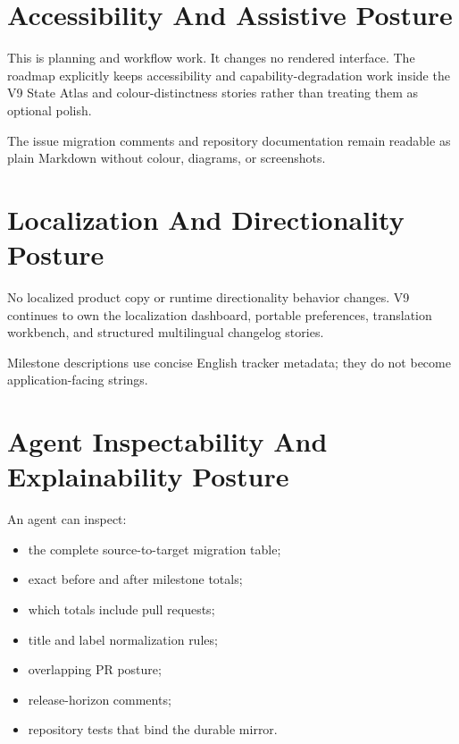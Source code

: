 \section{Accessibility And Assistive Posture}\label{record-249-accessibility-and-assistive-posture}

This is planning and workflow work. It changes no rendered interface. The roadmap explicitly keeps accessibility and capability-degradation work inside the V9 State Atlas and colour-distinctness stories rather than treating them as optional polish.

The issue migration comments and repository documentation remain readable as plain Markdown without colour, diagrams, or screenshots.

\section{Localization And Directionality Posture}\label{record-249-localization-and-directionality-posture}

No localized product copy or runtime directionality behavior changes. V9 continues to own the localization dashboard, portable preferences, translation workbench, and structured multilingual changelog stories.

Milestone descriptions use concise English tracker metadata; they do not become application-facing strings.

\section{Agent Inspectability And Explainability Posture}\label{record-249-agent-inspectability-and-explainability-posture}

An agent can inspect:

\begin{itemize}
\tightlist
\item
  the complete source-to-target migration table;
\item
  exact before and after milestone totals;
\item
  which totals include pull requests;
\item
  title and label normalization rules;
\item
  overlapping PR posture;
\item
  release-horizon comments;
\item
  repository tests that bind the durable mirror.
\end{itemize}

